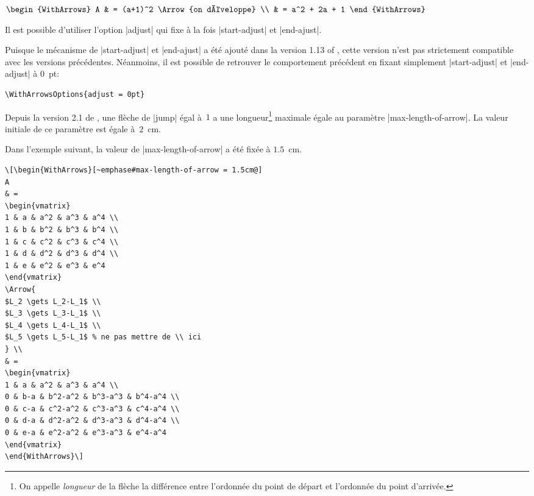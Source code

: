 \documentclass[dvipsnames]{article}%
\begin{document}
\begin{WithArrows}
\begin{WithArrows}[rr]
\medskip
$\begin{WithArrows}
A & = (a+1)^2 \Arrow{on développe} \\
  & = a^2 + 2a + 1  
\end{WithArrows}$


\bigskip
Il est possible d'utiliser l'option |adjust| qui fixe à la fois |start-adjust| et |end-ajust|.

\bigskip
Puisque le mécanisme de |start-adjust| et |end-ajust| a été ajouté dans la 
version 1.13 of , cette version n'est pas strictement compatible avec
les versions précédentes. Néanmoins, il est possible de retrouver le comportement précédent
en fixant simplement |start-adjust| et |end-adjust| à $0$~pt:
\begin{Verbatim}
\WithArrowsOptions{adjust = 0pt}
\end{Verbatim}

\bigskip
Depuis la version 2.1 de , une flèche de |jump| égal à~$1$ a une longueur\footnote{On appelle
  \emph{longueur} de la flèche la différence entre l'ordonnée du point de départ et l'ordonnée du point d'arrivée.}
maximale égale au paramètre |max-length-of-arrow|. La valeur initiale de ce paramètre est égale à~$2$~cm.

Dans l'exemple suivant, la valeur de |max-length-of-arrow| a été fixée à $1.5$~cm.
\begin{Verbatim}
\[\begin{WithArrows}[~emphase#max-length-of-arrow = 1.5cm@]
A 
& = 
\begin{vmatrix}
1 & a & a^2 & a^3 & a^4 \\
1 & b & b^2 & b^3 & b^4 \\
1 & c & c^2 & c^3 & c^4 \\
1 & d & d^2 & d^3 & d^4 \\
1 & e & e^2 & e^3 & e^4 
\end{vmatrix}
\Arrow{
$L_2 \gets L_2-L_1$ \\ 
$L_3 \gets L_3-L_1$ \\ 
$L_4 \gets L_4-L_1$ \\
$L_5 \gets L_5-L_1$ % ne pas mettre de \\ ici
} \\
& = 
\begin{vmatrix}
1 & a & a^2 & a^3 & a^4 \\
0 & b-a & b^2-a^2 & b^3-a^3 & b^4-a^4 \\
0 & c-a & c^2-a^2 & c^3-a^3 & c^4-a^4 \\
0 & d-a & d^2-a^2 & d^3-a^3 & d^4-a^4 \\
0 & e-a & e^2-a^2 & e^3-a^3 & e^4-a^4 
\end{vmatrix}
\end{WithArrows}\]
\end{Verbatim}



\end{WithArrows}
\end{WithArrows}
\end{document}
